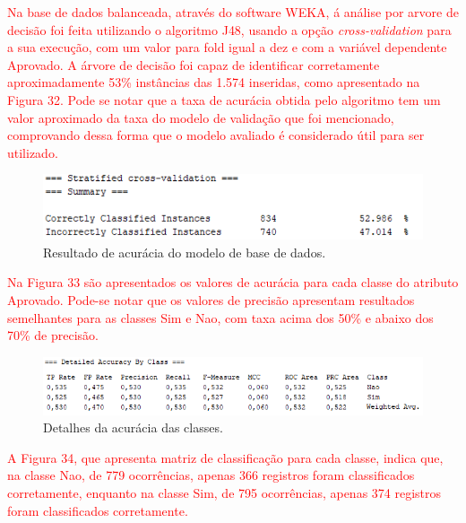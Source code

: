 \par
\textcolor{red}{Na base de dados balanceada, através do software WEKA, á análise por arvore de decisão foi feita utilizando o algoritmo J48, usando a opção \textit{cross-validation} para a sua execução, com um valor para fold igual a dez e com a variável dependente Aprovado. A árvore de decisão foi capaz de identificar corretamente aproximadamente 53\% instâncias das 1.574 inseridas, como apresentado na Figura 32. Pode se notar que a taxa de acurácia obtida pelo algoritmo tem um valor aproximado da taxa do modelo de validação que foi mencionado, comprovando dessa forma que o modelo avaliado é considerado útil para ser utilizado.}

\par
\begin{figure}[!htp]
	\begin{center}
    \caption{\label{fig:waveform_fig} Resultado de acurácia do modelo de base de dados.}
	\includegraphics[scale=0.99]{Figuras/Resultado_acuracia.png}
	\end{center}
\end{figure}

\par
\textcolor{red}{Na Figura 33 são apresentados os valores de acurácia para cada classe do atributo Aprovado. Pode-se notar que os valores de precisão apresentam resultados semelhantes para as classes Sim e Nao, com taxa acima dos 50\% e abaixo dos 70\% de precisão.}

\par
\begin{figure}[!htp]
	\begin{center}
    \caption{\label{fig:waveform_fig} Detalhes da acurácia das classes.}
	\includegraphics[scale=0.93]{Figuras/Tabela_de_acuracia_das_classes.png}
	\end{center}
\end{figure}

\textcolor{red}{A Figura 34, que apresenta matriz de classificação para cada classe, indica que, na classe Nao, de 779 ocorrências, apenas 366 registros foram classificados corretamente, enquanto na classe Sim, de 795 ocorrências, apenas 374 registros foram classificados corretamente.}

